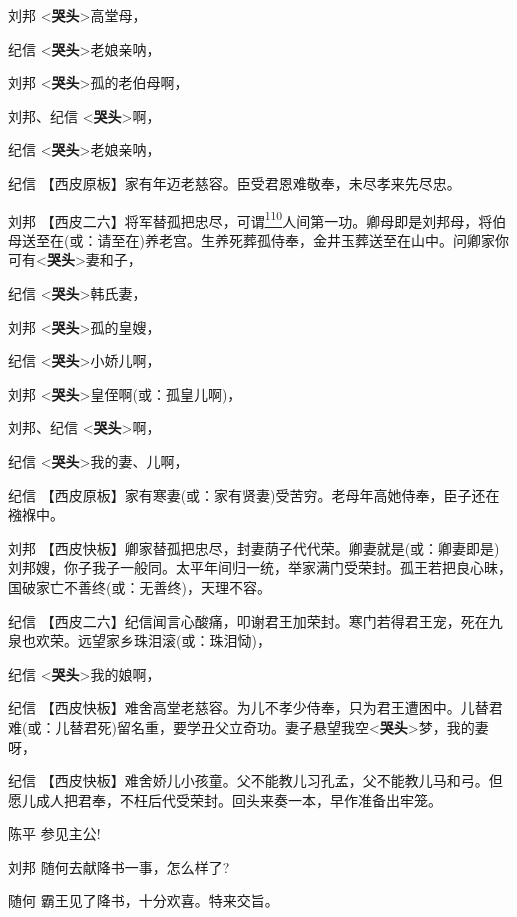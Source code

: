 刘邦 \textless{}\textbf{哭头}\textgreater{}高堂母，

纪信 \textless{}\textbf{哭头}\textgreater{}老娘亲呐，

刘邦 \textless{}\textbf{哭头}\textgreater{}孤的老伯母啊，

刘邦、纪信 \textless{}\textbf{哭头}\textgreater{}啊，

纪信 \textless{}\textbf{哭头}\textgreater{}老娘亲呐，

纪信 【西皮原板】家有年迈老慈容。臣受君恩难敬奉，未尽孝来先尽忠。

刘邦
【西皮二六】将军替孤把忠尽，可谓\protect\hyperlink{fn110}{\textsuperscript{110}}人间第一功。卿母即是刘邦母，将伯母送至在(或：请至在)养老宫。生养死葬孤侍奉，金井玉葬送至在山中。问卿家你可有\textless{}\textbf{哭头}\textgreater{}妻和子，

纪信 \textless{}\textbf{哭头}\textgreater{}韩氏妻，

刘邦 \textless{}\textbf{哭头}\textgreater{}孤的皇嫂，

纪信 \textless{}\textbf{哭头}\textgreater{}小娇儿啊，

刘邦 \textless{}\textbf{哭头}\textgreater{}皇侄啊(或：孤皇儿啊)，

刘邦、纪信 \textless{}\textbf{哭头}\textgreater{}啊，

纪信 \textless{}\textbf{哭头}\textgreater{}我的妻、儿啊，

纪信
【西皮原板】家有寒妻(或：家有贤妻)受苦穷。老母年高她侍奉，臣子还在襁褓中。

刘邦
【西皮快板】卿家替孤把忠尽，封妻荫子代代荣。卿妻就是(或：卿妻即是)刘邦嫂，你子我子一般同。太平年间归一统，举家满门受荣封。孤王若把良心昧，国破家亡不善终(或：无善终)，天理不容。

纪信
【西皮二六】纪信闻言心酸痛，叩谢君王加荣封。寒门若得君王宠，死在九泉也欢荣。远望家乡珠泪滚(或：珠泪恸)，

纪信 \textless{}\textbf{哭头}\textgreater{}我的娘啊，

纪信
【西皮快板】难舍高堂老慈容。为儿不孝少侍奉，只为君王遭困中。儿替君难(或：儿替君死)留名重，要学丑父立奇功。妻子悬望我空\textless{}\textbf{哭头}\textgreater{}梦，我的妻呀，

纪信
【西皮快板】难舍娇儿小孩童。父不能教儿习孔孟，父不能教儿马和弓。但愿儿成人把君奉，不枉后代受荣封。回头来奏一本，早作准备出牢笼。

陈平 参见主公!

刘邦 随何去献降书一事，怎么样了?

随何 霸王见了降书，十分欢喜。特来交旨。

